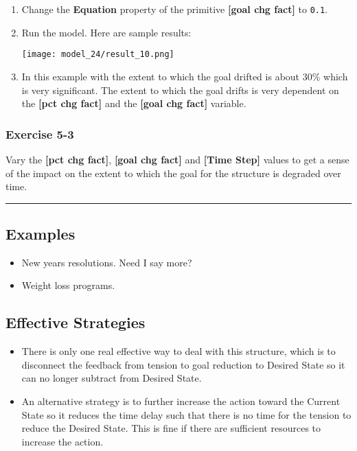 \documentclass[]{memoir}
\makeatletter
\def\maxwidth{\ifdim\Gin@nat@width>\linewidth\linewidth
\else\Gin@nat@width\fi}
\let\Oldincludegraphics\includegraphics
\renewcommand{\includegraphics}[1]{\Oldincludegraphics[width=\maxwidth]{#1}}
\newcommand{\p}[1]{\textbf{{[}#1{]}}}
\newcommand{\e}[1]{\texttt{#1}}
\renewcommand{\a}[1]{\textbf{#1}}
\makeatother
\begin{document}
\begin{oframed}
\begin{enumerate}
\item  Change the \a{Equation} property of the primitive \p{goal chg fact} to \e{0.1}.
\item Run the model. Here are sample results:\par \begin{minipage}{\linewidth}  \centering \texttt{[image: model\_24/result\_10.png]}
\end{minipage}
\item 

In this example with the extent to which the goal drifted is about 30\% which is very significant. The extent to which the goal drifts is very dependent on the \p{pct chg fact} and the \p{goal chg fact} variable.



\end{enumerate} \end{oframed}

\subsubsection{Exercise 5-3}

Vary the \p{pct chg fact}, \p{goal chg fact} and \p{Time Step} values to
get a sense of the impact on the extent to which the goal for the
structure is degraded over time.

\begin{center}\rule{3in}{0.4pt}\end{center}

\subsection{Examples}

\begin{itemize}
\itemsep1pt\parskip0pt
\item
  New years resolutions. Need I say more?
\item
  Weight loss programs.
\end{itemize}

\subsection{Effective Strategies}

\begin{itemize}
\itemsep1pt\parskip0pt
\item
  There is only one real effective way to deal with this structure,
  which is to disconnect the feedback from tension to goal reduction to
  Desired State so it can no longer subtract from Desired State.
\item
  An alternative strategy is to further increase the action toward the
  Current State so it reduces the time delay such that there is no time
  for the tension to reduce the Desired State. This is fine if there are
  sufficient resources to increase the action.
\end{itemize}
\end{document}
